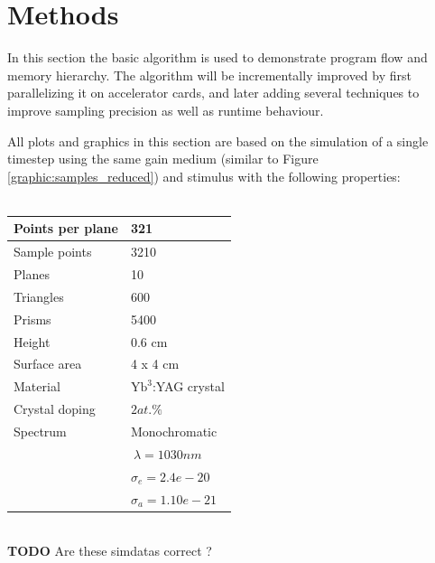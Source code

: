 \section{Methods}

In this section the basic algorithm is used to demonstrate
program flow and memory hierarchy. The algorithm will be incrementally improved
by first parallelizing it on accelerator cards, and later adding several
techniques to improve sampling precision as well as runtime behaviour.

All plots and graphics in this section
are based on the simulation of a single timestep using the same gain medium (similar to Figure
\ref{graphic:samples_reduced}) and stimulus
with the following properties:
\\
\\
\begin{tabular}{| l | l |}
\hline
Points per plane        & 321\\
\hline
Sample points           & 3210\\
\hline
Planes                  & 10\\
\hline
Triangles               & 600\\
\hline
Prisms                  & 5400\\
\hline
Height                  & 0.6 cm\\
\hline
Surface area            & 4 x 4 cm\\
\hline
Material                & $\text{Yb}^3$:YAG crystal\\
\hline
Crystal doping          & $2at.\%$\\
\hline
Spectrum                & Monochromatic\\
                        & $~\lambda = 1030nm$\\
                        & $\sigma_e = 2.4e-20$\\ 
                        & $\sigma_a =1.10e-21$\\
\hline
\end{tabular}
\\
\textbf{TODO} Are these simdatas correct ?\\

